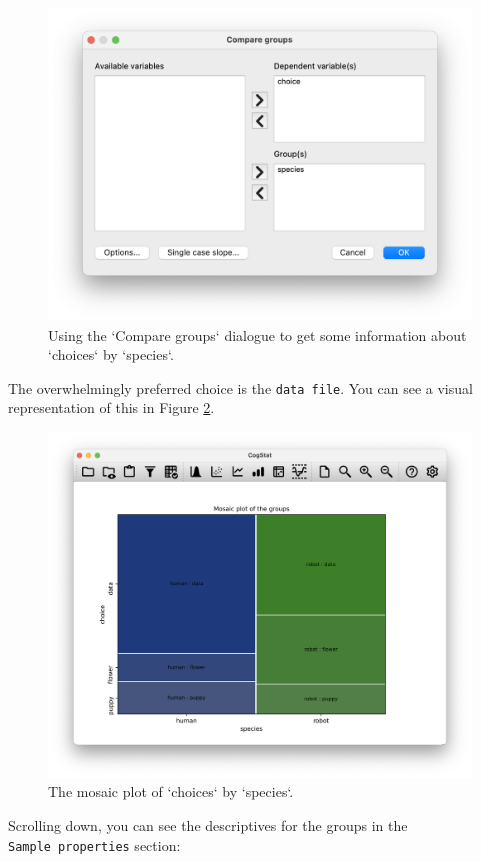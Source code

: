 \documentclass[
  11pt,
  a4paper,
  twoside,symmetric,openright]{book}
\theoremstyle{break}
\theoremstyle{break}
\begin{document}
\begin{figure}

{\centering \includegraphics[width=0.6\linewidth]{resources/image/cogstatcomparegroupschapek9} 

}

\caption{Using the `Compare groups` dialogue to get some information about `choices` by `species`.}\label{fig:cogstatchapek9}
\end{figure}

The overwhelmingly preferred choice is the \texttt{data\ file}. You can see a visual representation of this in Figure \ref{fig:cogstatchapek9mosaic}.

\begin{figure}

{\centering \includegraphics[width=0.6\linewidth]{resources/image/cogstatchapek9mosaic} 

}

\caption{The mosaic plot of `choices` by `species`.}\label{fig:cogstatchapek9mosaic}
\end{figure}

Scrolling down, you can see the descriptives for the groups in the \texttt{Sample\ properties} section:
\end{document}
